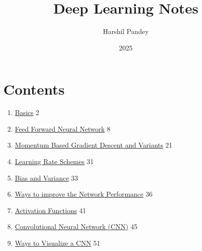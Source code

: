 \documentclass{article}
\title{Deep Learning Notes}
\author{Harshil Pandey}
\date{2025}
\begin{document}
\maketitle

\section*{Contents}
\begin{enumerate}
    \item \hyperlink{page.2}{Basics} \hfill 2
    \item \hyperlink{page.8}{Feed Forward Neural Network} \hfill 8
    \item \hyperlink{page.21}{Momentum Based Gradient Descent and Variants} \hfill 21
    \item \hyperlink{page.31}{Learning Rate Schemes} \hfill 31
    \item \hyperlink{page.33}{Bias and Variance} \hfill 33
    \item \hyperlink{page.36}{Ways to improve the Network Performance} \hfill 36
    \item \hyperlink{page.41}{Activation Functions} \hfill 41
    \item \hyperlink{page.45}{Convolutional Neural Network (CNN)} \hfill 45
    \item \hyperlink{page.51}{Ways to Visualize a CNN} \hfill 51
    
\end{enumerate}



\end{document}
